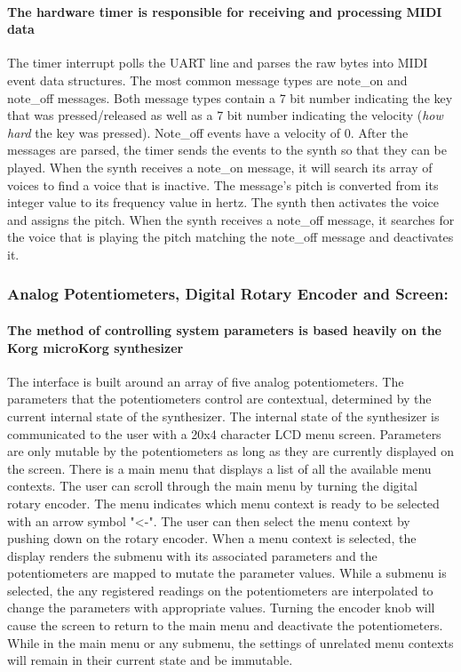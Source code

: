 \documentclass[acmlarge,screen]{acmart}
\begin{document}
	\paragraph{The hardware timer is responsible for receiving and processing MIDI data} The timer interrupt polls the UART line and parses the raw bytes into MIDI event data structures. The most common message types are note\_on and note\_off messages. Both message types contain a 7 bit number indicating the key that was pressed/released as well as a 7 bit number indicating the velocity (\textit{how hard} the key was pressed). Note\_off events have a velocity of 0.\cite{huber_2007} After the messages are parsed, the timer sends the events to the synth so that they can be played. When the synth receives a note\_on message, it will search its array of voices to find a voice that is inactive. The message's pitch is converted from its integer value to its frequency value in hertz. The synth then activates the voice and assigns the pitch. When the synth receives a note\_off message, it searches for the voice that is playing the pitch matching the note\_off message and deactivates it.
	
	\subsubsection{Analog Potentiometers, Digital Rotary Encoder and Screen:}
	\paragraph{The method of controlling system parameters is based heavily on the Korg microKorg synthesizer} The interface is built around an array of five analog potentiometers. The parameters that the potentiometers control are contextual, determined by the current internal state of the synthesizer. The internal state of the synthesizer is communicated to the user with a 20x4 character LCD menu screen. Parameters are only mutable by the potentiometers as long as they are currently displayed on the screen. There is a main menu that displays a list of all the available menu contexts. The user can scroll through the main menu by turning the digital rotary encoder. The menu indicates which menu context is ready to be selected with an arrow symbol "<-". The user can then select the menu context by pushing down on the rotary encoder. When a menu context is selected, the display renders the submenu with its associated parameters and the potentiometers are mapped to mutate the parameter values. While a submenu is selected, the any registered readings on the potentiometers are interpolated to change the parameters with appropriate values. Turning the encoder knob will cause the screen to return to the main menu and deactivate the potentiometers. While in the main menu or any submenu, the settings of unrelated menu contexts will remain in their current state and be immutable.
	
\end{document}
